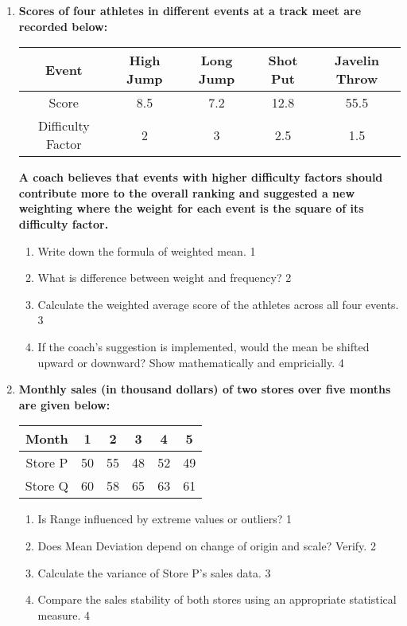 \documentclass[12pt]{article}
\begin{document}
\begin{enumerate}
  \item
    \textbf{Scores of four athletes in different events at a track meet are recorded below:}

\begin{table}[h]
\centering
\begin{tabular}{c|c|c|c|c}
\hline
Event & High Jump & Long Jump & Shot Put & Javelin Throw \\ \hline
Score & 8.5 & 7.2 & 12.8 & 55.5 \\ \hline
Difficulty Factor & 2 & 3 & 2.5 & 1.5 \\ \hline
\end{tabular}
\end{table}

\textbf{A coach believes that events with higher difficulty factors should contribute more to the overall ranking and suggested a new weighting where the weight for each event is the square of its difficulty factor.}

  \begin{enumerate}
    \item
	Write down the formula of weighted mean. \hfill 1
    \item
	What is difference between weight and frequency? \hfill 2
	 \item Calculate the weighted average score of the athletes across all four events. \hfill 3
    \item If the coach's suggestion is implemented, would the mean be shifted upward or downward? Show mathematically and empricially. \hfill 4
  \end{enumerate}

\item  
  \textbf{Monthly sales (in thousand dollars) of two stores over five months are given below:}

\begin{table}[h]
\centering
\begin{tabular}{c|ccccc}
Month     & 1  & 2  & 3  & 4  & 5  \\ \hline
Store P  & 50 & 55 & 48 & 52 & 49 \\
Store Q  & 60 & 58 & 65 & 63 & 61
\end{tabular}
\end{table}

  \begin{enumerate}
   \item Is Range influenced by extreme values or outliers? \hfill 1
   \item Does Mean Deviation depend on change of origin and scale? Verify. \hfill 2
    \item  
	Calculate the variance of Store P’s sales data.  \hfill 3  
    \item  
	Compare the sales stability of both stores using an appropriate statistical measure.  \hfill 4  
\end{enumerate}  



\end{enumerate}
\end{document}
